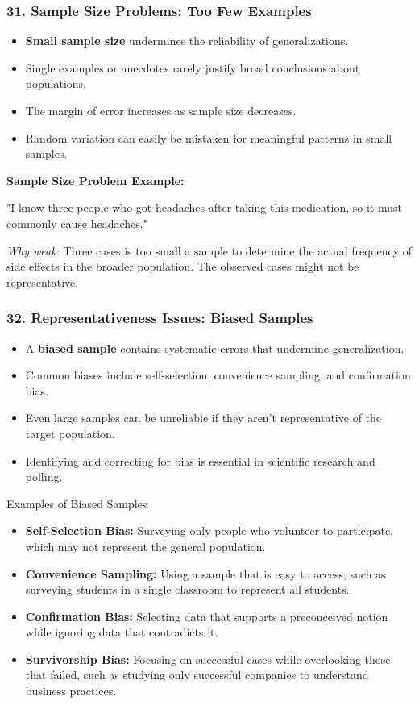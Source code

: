 \documentclass{beamer}
\begin{document}
\begin{frame}
\frametitle{31. Sample Size Problems: Too Few Examples}
\begin{itemize}
\item \textbf{Small sample size} undermines the reliability of generalizations.
\item Single examples or anecdotes rarely justify broad conclusions about populations.
\item The margin of error increases as sample size decreases.
\item Random variation can easily be mistaken for meaningful patterns in small samples.
\end{itemize}

\begin{example}
\textbf{Sample Size Problem Example:}

"I know three people who got headaches after taking this medication, so it must commonly cause headaches."

\textit{Why weak:} Three cases is too small a sample to determine the actual frequency of side effects in the broader population. The observed cases might not be representative.
\end{example}
\end{frame}


\begin{frame}
\frametitle{32. Representativeness Issues: Biased Samples}
\begin{itemize}
\item A \textbf{biased sample} contains systematic errors that undermine generalization.
\item Common biases include self-selection, convenience sampling, and confirmation bias.
\item Even large samples can be unreliable if they aren't representative of the target population.
\item Identifying and correcting for bias is essential in scientific research and polling.
\end{itemize}

\begin{alertblock}{Examples of Biased Samples}
\scriptsize
\begin{itemize}
\item \textbf{Self-Selection Bias:} Surveying only people who volunteer to participate, which may not represent the general population.
\item \textbf{Convenience Sampling:} Using a sample that is easy to access, such as surveying students in a single classroom to represent all students.
\item \textbf{Confirmation Bias:} Selecting data that supports a preconceived notion while ignoring data that contradicts it.
\item \textbf{Survivorship Bias:} Focusing on successful cases while overlooking those that failed, such as studying only successful companies to understand business practices.
\end{itemize}
\end{alertblock}
\end{frame}
\end{document}
